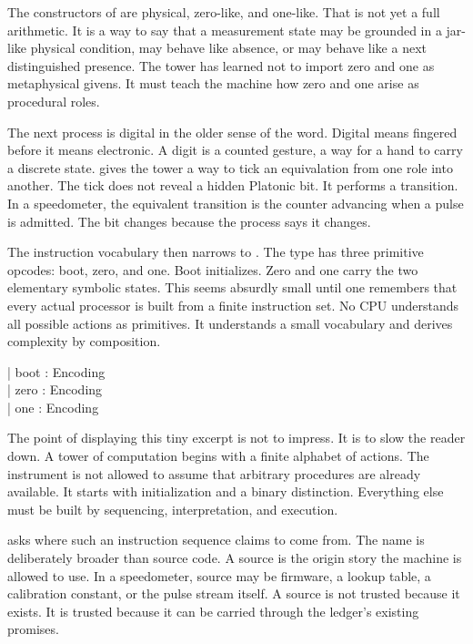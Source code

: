 The constructors of  are physical, zero-like, and one-like.
That is not yet a full arithmetic. It is a way to say that a measurement state
may be grounded in a jar-like physical condition, may behave like absence, or
may behave like a next distinguished presence. The tower has learned not to
import zero and one as metaphysical givens. It must teach the machine how zero
and one arise as procedural roles.

The next process is digital in the older sense of the word. Digital means
fingered before it means electronic. A digit is a counted gesture, a way for a
hand to carry a discrete state.  gives the tower a way to
tick an equivalation from one role into another. The tick does not reveal a
hidden Platonic bit. It performs a transition. In a speedometer, the equivalent
transition is the counter advancing when a pulse is admitted. The bit changes
because the process says it changes.

The instruction vocabulary then narrows to . The type has three
primitive opcodes: boot, zero, and one. Boot initializes. Zero and one carry
the two elementary symbolic states. This seems absurdly small until one
remembers that every actual processor is built from a finite instruction set.
No CPU understands all possible actions as primitives. It understands a small
vocabulary and derives complexity by composition.

\begin{leancode}
| boot : Encoding\\
| zero : Encoding\\
| one : Encoding
\end{leancode}

The point of displaying this tiny excerpt is not to impress. It is to slow the
reader down. A tower of computation begins with a finite alphabet of actions.
The instrument is not allowed to assume that arbitrary procedures are already
available. It starts with initialization and a binary distinction. Everything
else must be built by sequencing, interpretation, and execution.

 asks where such an instruction sequence claims to come from. The
name is deliberately broader than source code. A source is the origin story the
machine is allowed to use. In a speedometer, source may be firmware, a lookup
table, a calibration constant, or the pulse stream itself. A source is not
trusted because it exists. It is trusted because it can be carried through the
ledger's existing promises.


